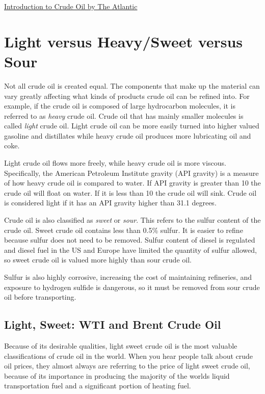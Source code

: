 \documentclass[
  letterpaper,
  DIV=11,
  numbers=noendperiod]{scrreprt}
\begin{document}
\href{https://www.youtube.com/watch?v=62LvVYYqUFA}{Introduction to Crude
Oil by The Atlantic}

\hypertarget{light-versus-heavysweet-versus-sour}{%
\section{Light versus Heavy/Sweet versus
Sour}\label{light-versus-heavysweet-versus-sour}}

Not all crude oil is created equal. The components that make up the
material can vary greatly affecting what kinds of products crude oil can
be refined into. For example, if the crude oil is composed of large
hydrocarbon molecules, it is referred to as \emph{heavy} crude oil.
Crude oil that has mainly smaller molecules is called \emph{light} crude
oil. Light crude oil can be more easily turned into higher valued
gasoline and distillates while heavy crude oil produces more lubricating
oil and coke.

Light crude oil flows more freely, while heavy crude oil is more
viscous. Specifically, the American Petroleum Institute gravity (API
gravity) is a measure of how heavy crude oil is compared to water. If
API gravity is greater than 10 the crude oil will float on water. If it
is less than 10 the crude oil will sink. Crude oil is considered light
if it has an API gravity higher than 31.1 degrees.

Crude oil is also classified as \emph{sweet} or \emph{sour}. This refers
to the sulfur content of the crude oil. Sweet crude oil contains less
than 0.5\% sulfur. It is easier to refine because sulfur does not need
to be removed. Sulfur content of diesel is regulated and diesel fuel in
the US and Europe have limited the quantity of sulfur allowed, so sweet
crude oil is valued more highly than sour crude oil.

Sulfur is also highly corrosive, increasing the cost of maintaining
refineries, and exposure to hydrogen sulfide is dangerous, so it must be
removed from sour crude oil before transporting.

\hypertarget{light-sweet-wti-and-brent-crude-oil}{%
\subsection{Light, Sweet: WTI and Brent Crude
Oil}\label{light-sweet-wti-and-brent-crude-oil}}

Because of its desirable qualities, light sweet crude oil is the most
valuable classifications of crude oil in the world. When you hear people
talk about crude oil prices, they almost always are referring to the
price of light sweet crude oil, because of its importance in producing
the majority of the worlds liquid transportation fuel and a significant
portion of heating fuel.
\end{document}
